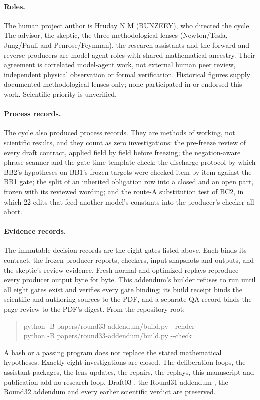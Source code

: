 \paragraph{Roles.} The human project author is Hruday N M (BUNZEEY), who
directed the cycle. The advisor, the skeptic, the three methodological lenses
(Newton/Tesla, Jung/Pauli and Penrose/Feynman), the research assistants and
the forward and reverse producers are model-agent roles with shared
mathematical ancestry. Their agreement is correlated model-agent work, not
external human peer review, independent physical observation or formal
verification. Historical figures supply documented methodological lenses
only; none participated in or endorsed this work. Scientific priority is
unverified.

\paragraph{Process records.} The cycle also produced process records. They
are methods of working, not scientific results, and they count as zero
investigations: the pre-freeze review of every draft contract, applied field
by field before freezing; the negation-aware phrase scanner and the gate-time
template check; the discharge protocol by which BB2's hypotheses on BB1's
frozen targets were checked item by item against the BB1 gate; the split of
an inherited obligation row into a closed and an open part, frozen with its
reviewed wording; and the route-A substitution test of BC2, in which 22 edits
that feed another model's constants into the producer's checker all abort.

\paragraph{Evidence records.} The immutable decision records are the eight
gates listed above. Each binds its contract, the frozen producer reports,
checkers, input snapshots and outputs, and the skeptic's review evidence.
Fresh normal and optimized replays reproduce every producer output byte for
byte. This addendum's builder refuses to run until all eight gates exist and
verifies every gate binding; its build receipt binds the scientific and
authoring sources to the PDF, and a separate QA record binds the page review
to the PDF's digest. From the repository root:
\begin{quote}\small\ttfamily
python -B papers/round33-addendum/build.py -{}-render\\
python -B papers/round33-addendum/build.py -{}-check
\end{quote}
A hash or a passing program does not replace the stated mathematical
hypotheses. Exactly eight investigations are closed. The deliberation loops,
the assistant packages, the lens updates, the repairs, the replays, this
manuscript and publication add no research loop. Draft03 \cite{draft03}, the
Round31 addendum \cite{r31add}, the Round32 addendum \cite{r32add} and every
earlier scientific verdict are preserved.
